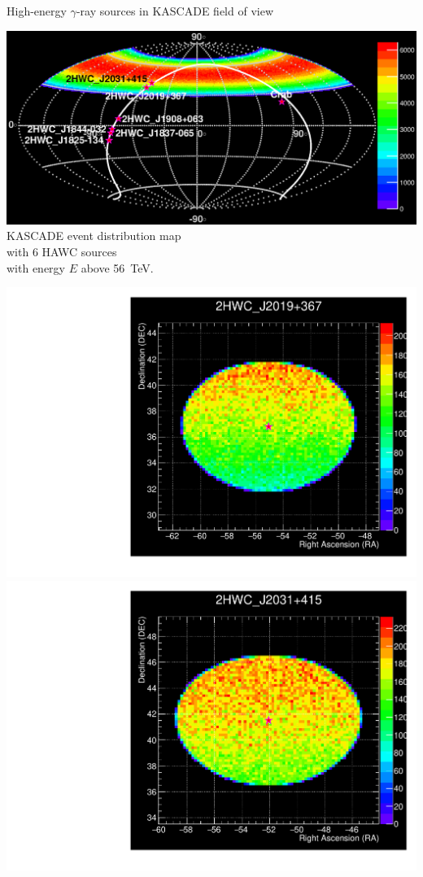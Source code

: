 \begin{frame}{High-energy $\gamma$-ray sources in KASCADE field of view}
\begin{minipage}[c]{0.73\textwidth}
\begin{center}
  \includegraphics[width=1\textwidth]{pics/Skymap_6srcs.eps}\\
  KASCADE event distribution map\\
  with 6 HAWC sources\\
  with energy $E$ above 56~TeV.
\end{center}
\end{minipage}
\hfill
\begin{minipage}[c]{0.25\textwidth}
\includegraphics[width=1\textwidth]{pics/Skymap_2HWC_J2019+367.pdf}\\
\includegraphics[width=1\textwidth]{pics/Skymap_2HWC_J2031+415.pdf}

\end{minipage}
\end{frame}
